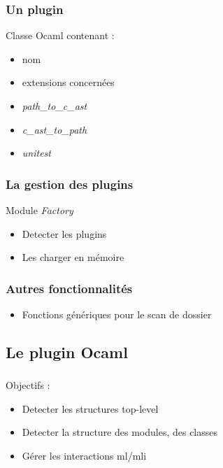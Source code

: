 \documentclass{beamer}
\begin{document}
\begin{frame}
    \frametitle{Un plugin}

    Classe Ocaml contenant :
    \begin{itemize}
        \item nom
        \item extensions concernées
        \item \textit{path\_to\_c\_ast}    
        \item \textit{c\_ast\_to\_path}
        \item \textit{unitest}    
    \end{itemize}        
\end{frame}

\begin{frame}
    \frametitle{La gestion des plugins}

    Module \textit{Factory}
    \begin{itemize}
        \item Detecter les plugins
        \item Les charger en mémoire    
    \end{itemize}        
\end{frame}   

\begin{frame}
    \frametitle{Autres fonctionnalités}
    
    \begin{itemize}
        \item Fonctions génériques pour le scan de dossier
    \end{itemize}        
\end{frame}    







\begin{frame}
    \section{Le plugin Ocaml}
    \frametitle{}
 
 Objectifs :
 \begin{itemize}
    \item Detecter les structures top-level 
    \item Detecter la structure des modules, des classes
    \item Gérer les interactions ml/mli
 \end{itemize}

\end{frame}
\end{document}
